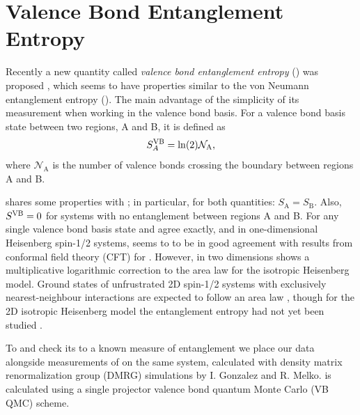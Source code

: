 \chapter{Valence Bond Entanglement Entropy}

Recently a new quantity called {\it{valence bond entanglement entropy}} (\vB) was proposed \cite{Ian1, Alet, Chh},  
which seems to have properties similar to the von Neumann entanglement entropy (\vN).
The main advantage of \vb the simplicity of its measurement when working in the valence bond basis.
For a valence bond basis state \vb between two regions, A and B, it is defined as 
\begin{equation}
S^{\text{VB}}_A = \ln({2})\mathcal{N}_{\text{A}},
\end{equation} 
where $\mathcal{N}_{\text{A}}$ is the number of valence bonds crossing the boundary between
regions A and B.


\vb shares some properties with \vN; in particular, for both quantities: $S_{\text{A}} = S_{\text{B}}$.
Also, $S^{\text{VB}} = 0$ for systems with no entanglement between regions A and B.
For any single valence bond basis state \vb and \vn agree exactly, and
in one-dimensional Heisenberg spin-1/2 systems, \vb seems to to be in good agreement with
results from conformal field theory (CFT) for \vN.
However, in two dimensions \vb shows a multiplicative logarithmic correction to the area law
for the isotropic Heisenberg model.  
Ground states of unfrustrated 2D spin-1/2 systems with exclusively nearest-neighbour interactions
are expected to follow an area law , though for the 2D isotropic Heisenberg model the entanglement entropy had not yet been studied .


To   and check its  to a known measure of entanglement we place our \vb data alongside measurements of \vn
on the same system, calculated with density matrix renormalization group (DMRG) simulations by I. Gonzalez and R. Melko.
\vb is calculated using a single projector valence bond quantum Monte Carlo (VB QMC) scheme.

